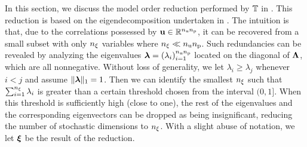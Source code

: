 In this section, we discuss the model order reduction performed by $\transformation$ in .
This reduction is based on the eigendecomposition undertaken in .
The intuition is that, due to the correlations possessed by $\vu \in \real^{\nparams \nprocs}$, it can be recovered from a small subset with only $\nvars$ variables where $\nvars \ll \nparams \nprocs$.
Such redundancies can be revealed by analyzing the eigenvalues $\dimensionContribution = (\lambda_i)_{i = 1}^{\nparams \nprocs}$ located on the diagonal of $\mEDL$, which are all nonnegative.
Without loss of generality, we let $\lambda_i \geq \lambda_j$ whenever $i < j$ and assume $\norm[1]{\dimensionContribution} = 1$.
Then we can identify the smallest $\nvars$ such that $\sum_{i = 1}^\nvars \lambda_i$ is greater than a certain threshold chosen from the interval $(0, 1]$.
When this threshold is sufficiently high (close to one), the rest of the eigenvalues and the corresponding eigenvectors can be dropped as being insignificant, reducing the number of stochastic dimensions to $\nvars$.
With a slight abuse of notation, we let $\vz$ be the result of the reduction.
